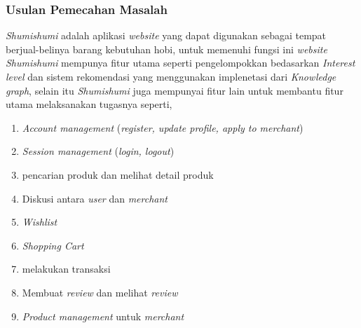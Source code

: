 \documentclass[a4paper]{article}
\newcommand{\subsubbab}[1]{%
    \subsubsection{#1}%
}
\begin{document}
\subsubbab{Usulan Pemecahan Masalah}

\textit{Shumishumi} adalah aplikasi \textit{website} yang dapat digunakan sebagai tempat berjual-belinya barang kebutuhan hobi, untuk memenuhi fungsi ini \textit{website Shumishumi} mempunya fitur utama seperti pengelompokkan bedasarkan \textit{Interest level} dan sistem rekomendasi yang menggunakan implenetasi dari \textit{Knowledge graph}, selain itu \textit{Shumishumi} juga mempunyai fitur lain untuk membantu fitur utama melaksanakan tugasnya seperti,
\begin{enumerate}
    \item \textit{Account management} (\textit{register, update profile, apply to merchant})
    \item \textit{Session management} (\textit{login, logout})
    \item pencarian produk dan melihat detail produk
    \item Diskusi antara \textit{user} dan \textit{merchant}
    \item \textit{Wishlist}
    \item \textit{Shopping Cart}
    \item melakukan transaksi
    \item Membuat \textit{review} dan melihat \textit{review}
    \item \textit{Product management} untuk \textit{merchant}
\end{enumerate}
\end{document}
